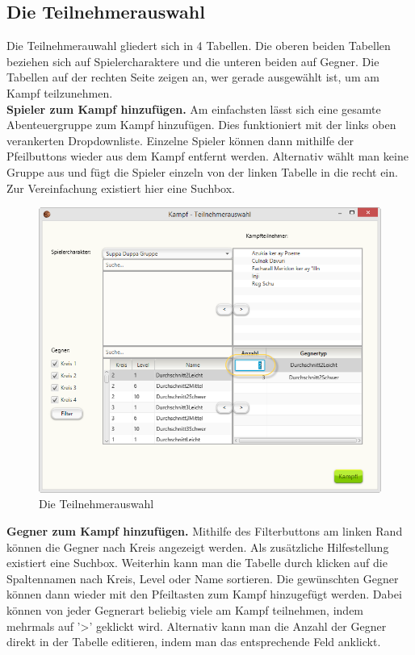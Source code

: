 \documentclass[11pt, a4paper, german]{article}
\begin{document}
\subsection{Die Teilnehmerauswahl}
Die Teilnehmerauwahl gliedert sich in 4 Tabellen. Die oberen beiden Tabellen beziehen sich auf Spielercharaktere und die unteren beiden auf Gegner. Die Tabellen auf der rechten Seite zeigen an, wer gerade ausgewählt ist, um am Kampf teilzunehmen.\\

\textbf{Spieler zum Kampf hinzufügen.} Am einfachsten lässt sich eine gesamte Abenteuergruppe zum Kampf hinzufügen. Dies funktioniert mit der links oben verankerten Dropdownliste. Einzelne Spieler können dann mithilfe der Pfeilbuttons wieder aus dem Kampf entfernt werden. Alternativ wählt man keine Gruppe aus und fügt die Spieler einzeln von der linken Tabelle in die recht ein. Zur Vereinfachung existiert hier eine Suchbox.\\
\begin{figure}
\centering
\includegraphics[width=.7\linewidth]{Bilder/Teilnehmerauswahl}
\caption{Die Teilnehmerauswahl}
\end{figure}

\textbf{Gegner zum Kampf hinzufügen.} Mithilfe des Filterbuttons am linken Rand können die Gegner nach Kreis angezeigt werden. Als zusätzliche Hilfestellung existiert eine Suchbox. Weiterhin kann man die Tabelle durch klicken auf die Spaltennamen nach Kreis, Level oder Name sortieren. Die gewünschten Gegner können dann wieder mit den Pfeiltasten zum Kampf hinzugefügt werden. Dabei können von jeder Gegnerart beliebig viele am Kampf teilnehmen, indem mehrmals auf '>' geklickt wird. Alternativ kann man die Anzahl der Gegner direkt in der Tabelle editieren, indem man das entsprechende Feld anklickt.\\
\end{document}
